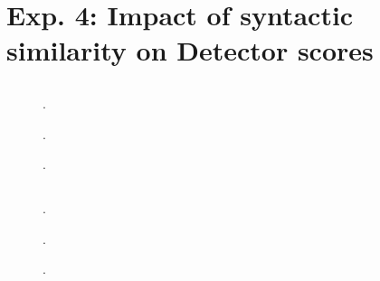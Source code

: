 \section{Exp. 4: Impact of syntactic similarity on \imp{} Detector scores}
\label{sec:syn_sim_impact}

\subsection{\dataStudent{}}
\begin{figure}[htbp]
    \centering
    
    \caption{.}
    \label{fig:impact_syn_student_diff}
\end{figure}

\begin{figure}[htbp]
    \centering
    
    \caption{.}
    \label{fig:impact_syn_student_disp_cand}
\end{figure}

\begin{figure}[htbp]
    \centering
    
    \caption{.}
    \label{fig:impact_syn_student_ref_paraph}
\end{figure}

\subsection{\dataBlog{}}
\begin{figure}[htbp]
    \centering
    
    \caption{.}
    \label{fig:impact_syn_student_diff_acc}
\end{figure}

\begin{figure}[htbp]
    \centering
    
    \caption{.}
    \label{fig:impact_syn_student_diff_prec}
\end{figure}

\begin{figure}[htbp]
    \centering
    
    \caption{.}
    \label{fig:impact_syn_student_diff_f1}
\end{figure}